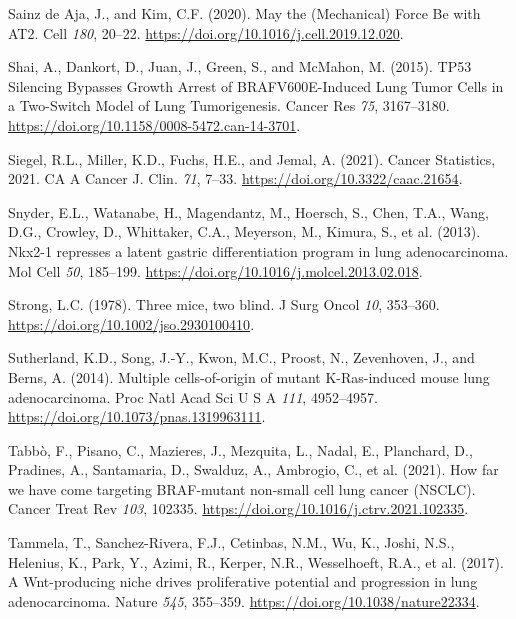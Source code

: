 \begin{CSLReferences}{0}{0}
\leavevmode{}%
Sainz de Aja, J., and Kim, C.F. (2020). May the (Mechanical) Force Be with AT2. Cell \emph{180}, 20--22. \url{https://doi.org/10.1016/j.cell.2019.12.020}.

\leavevmode{}%
Shai, A., Dankort, D., Juan, J., Green, S., and McMahon, M. (2015). TP53 Silencing Bypasses Growth Arrest of BRAFV600E-Induced Lung Tumor Cells in a Two-Switch Model of Lung Tumorigenesis. Cancer Res \emph{75}, 3167--3180. \url{https://doi.org/10.1158/0008-5472.can-14-3701}.

\leavevmode{}%
Siegel, R.L., Miller, K.D., Fuchs, H.E., and Jemal, A. (2021). Cancer Statistics, 2021. CA A Cancer J. Clin. \emph{71}, 7--33. \url{https://doi.org/10.3322/caac.21654}.

\leavevmode{}%
Snyder, E.L., Watanabe, H., Magendantz, M., Hoersch, S., Chen, T.A., Wang, D.G., Crowley, D., Whittaker, C.A., Meyerson, M., Kimura, S., et al. (2013). Nkx2-1 represses a latent gastric differentiation program in lung adenocarcinoma. Mol Cell \emph{50}, 185--199. \url{https://doi.org/10.1016/j.molcel.2013.02.018}.

\leavevmode{}%
Strong, L.C. (1978). Three mice, two blind. J Surg Oncol \emph{10}, 353--360. \url{https://doi.org/10.1002/jso.2930100410}.

\leavevmode{}%
Sutherland, K.D., Song, J.-Y., Kwon, M.C., Proost, N., Zevenhoven, J., and Berns, A. (2014). Multiple cells-of-origin of mutant K-Ras-induced mouse lung adenocarcinoma. Proc Natl Acad Sci U S A \emph{111}, 4952--4957. \url{https://doi.org/10.1073/pnas.1319963111}.

\leavevmode{}%
Tabbò, F., Pisano, C., Mazieres, J., Mezquita, L., Nadal, E., Planchard, D., Pradines, A., Santamaria, D., Swalduz, A., Ambrogio, C., et al. (2021). How far we have come targeting BRAF-mutant non-small cell lung cancer (NSCLC). Cancer Treat Rev \emph{103}, 102335. \url{https://doi.org/10.1016/j.ctrv.2021.102335}.

\leavevmode{}%
Tammela, T., Sanchez-Rivera, F.J., Cetinbas, N.M., Wu, K., Joshi, N.S., Helenius, K., Park, Y., Azimi, R., Kerper, N.R., Wesselhoeft, R.A., et al. (2017). A Wnt-producing niche drives proliferative potential and progression in lung adenocarcinoma. Nature \emph{545}, 355--359. \url{https://doi.org/10.1038/nature22334}.


\end{CSLReferences}
